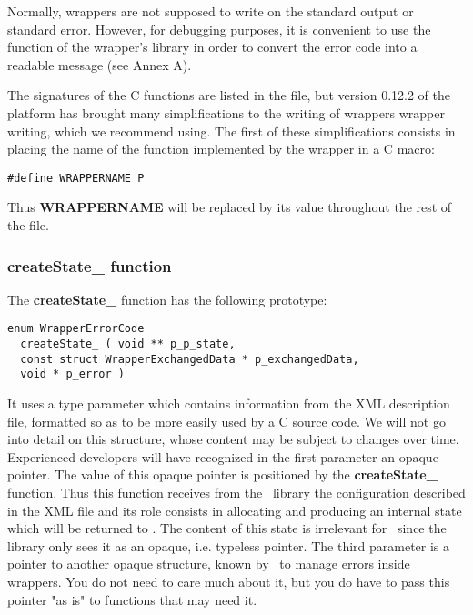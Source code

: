Normally, wrappers are not supposed to write on the standard output or standard error. However, for debugging purposes, it is convenient to use the  function of the wrapper's library in order to convert the error code into a readable message (see Annex A).

The signatures of the C functions are listed in the  file, but version 0.12.2 of the platform has brought many simplifications to the writing of wrappers wrapper writing, which we recommend using. The first of these simplifications consists in placing the name of the function implemented by the wrapper in a C macro:

\lstset{language=C++, basicstyle=\normalsize}
\begin{lstlisting}[frame=TBRL]
  #define WRAPPERNAME P
\end{lstlisting}

Thus {\bf WRAPPERNAME} will be replaced by its value throughout the rest of the file.

\subsubsection{createState\_ function}

The {\bf createState\_} function has the following prototype:

\lstset{language=C++, basicstyle=\normalsize}
\begin{lstlisting}[frame=TBRL]
  enum WrapperErrorCode
  createState_ ( void ** p_p_state,
  const struct WrapperExchangedData * p_exchangedData,
  void * p_error )
\end{lstlisting}

It uses a  type parameter which contains information from the XML description file, formatted so as to be more easily used by a C source code. We will not go into detail on this structure, whose content may be subject to changes over time. Experienced developers will have recognized in the first parameter an opaque pointer. The value of this opaque pointer is positioned by the {\bf createState\_} function. Thus this function receives from the \OT\ library the configuration described in the XML file and its role consists in allocating and producing an internal state which will be returned to \OT . The content of this state is irrelevant for \OT\ since the library only sees it as an opaque, i.e. typeless pointer. The third parameter is a pointer to another opaque structure, known by \OT\ to manage errors inside wrappers. You do not need to care much about it, but you do have to pass this pointer "as is" to functions that may need it.


